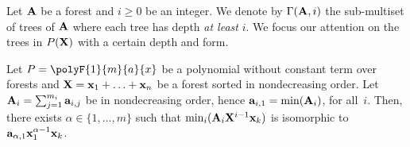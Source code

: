 		Let $\forest{A}$ be a forest and $i\ge0$ be an integer. 
		We denote by %
                $\Gamma(\forest{A},i)$ the sub-multiset of trees of $\forest{A}$ where each tree has depth \emph{at least} $i$.
		We focus our attention on the trees in $P(\forest{X})$ with a
		certain depth and form.
		
		\begin{lemma}\label{lemme:ordreProdFin}
	
			Let $P = \polyF{1}{m}{a}{x}$ be a polynomial without constant term over forests and $\forest{X}= \tree{x}_1 + \ldots + \tree{x}_n$ be a forest sorted in nondecreasing order.
			Let $\forest{A}_i = \sum_{j = 1}^{m_i} \tree{a}_{i,j}$ be in nondecreasing order, hence $\tree{a}_{i,1} = \min(\forest{a}_i)$, for all~$i$.
			Then, there exists $\alpha \in \{1, \ldots, m\}$ such that $\min_{i}(\forest{A}_i \forest{X}^{i-1} \tree{x}_k)$ is isomorphic to $\tree{a}_{\alpha,1} \tree{x}_1^{\alpha-1}\tree{x}_k$.
		\end{lemma}
		
